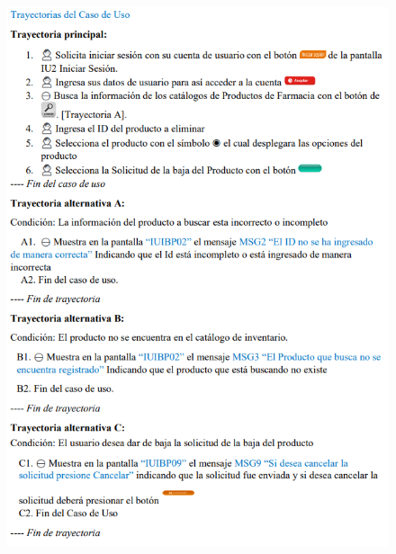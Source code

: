 \documentclass[12pt,letterpaper]{article}
\begin{document}
            \begin{figure}[H]
                \centering
                \includegraphics [scale=0.9]{specs/trayEliminarMedicamento}
            \end{figure}
\end{document}
